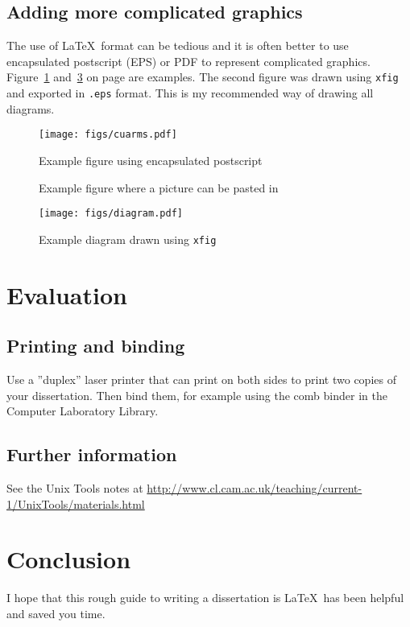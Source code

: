 \documentclass[12pt,a4paper,twoside,openright]{report}
\begin{document}
\section{Adding more complicated graphics}
The use of \LaTeX\ format can be tedious and it is often better to use
encapsulated postscript (EPS) or PDF to represent complicated graphics.
Figure~\ref{epsfig} and~\ref{xfig} on page \pageref{xfig} are
examples. The second figure was drawn using \texttt{xfig} and exported in
{\tt.eps} format. This is my recommended way of drawing all diagrams.
\begin{figure}[tbh]
\centerline{\texttt{[image: figs/cuarms.pdf]}}
\caption{Example figure using encapsulated postscript}
\label{epsfig}
\end{figure}
\begin{figure}[tbh]
\vspace{4in}
\caption{Example figure where a picture can be pasted in}
\label{pastedfig}
\end{figure}
\begin{figure}[tbh]
\centerline{\texttt{[image: figs/diagram.pdf]}}
\caption{Example diagram drawn using \texttt{xfig}}
\label{xfig}
\end{figure}
\chapter{Evaluation}
\section{Printing and binding}
Use a ''duplex'' laser printer that can print on both sides to print
two copies of your dissertation. Then bind them, for example using the
comb binder in the Computer Laboratory Library.
\section{Further information}
See the Unix Tools notes at
\url{http://www.cl.cam.ac.uk/teaching/current-1/UnixTools/materials.html}
\chapter{Conclusion}
I hope that this rough guide to writing a dissertation is \LaTeX\ has
been helpful and saved you time.

\appendix
\end{document}
